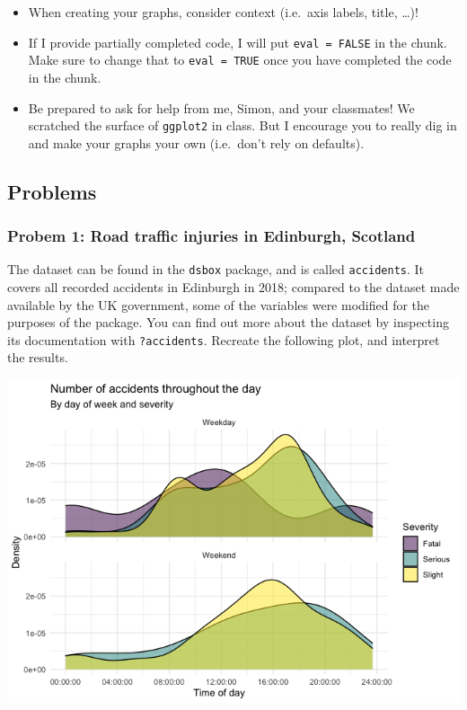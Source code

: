 \documentclass[
]{article}
\providecommand{\tightlist}{%
  \setlength{\itemsep}{0pt}\setlength{\parskip}{0pt}}
\begin{document}
\begin{itemize}
\tightlist
\item
  When creating your graphs, consider context (i.e.~axis labels, title,
  \ldots)!
\item
  If I provide partially completed code, I will put
  \texttt{eval\ =\ FALSE} in the chunk. Make sure to change that to
  \texttt{eval\ =\ TRUE} once you have completed the code in the chunk.
\item
  Be prepared to ask for help from me, Simon, and your classmates! We
  scratched the surface of \texttt{ggplot2} in class. But I encourage
  you to really dig in and make your graphs your own (i.e.~don't rely on
  defaults).
\end{itemize}

\hypertarget{problems}{%
\subsection{Problems}\label{problems}}

\hypertarget{probem-1-road-traffic-injuries-in-edinburgh-scotland}{%
\subsubsection{Probem 1: Road traffic injuries in Edinburgh,
Scotland}\label{probem-1-road-traffic-injuries-in-edinburgh-scotland}}

The dataset can be found in the \texttt{dsbox} package, and is called
\texttt{accidents}. It covers all recorded accidents in Edinburgh in
2018; compared to the dataset made available by the UK government, some
of the variables were modified for the purposes of the package. You can
find out more about the dataset by inspecting its documentation with
\texttt{?accidents}. Recreate the following plot, and interpret the
results.

\includegraphics[width=1\linewidth]{../img/edi-accidents-1}
\end{document}
